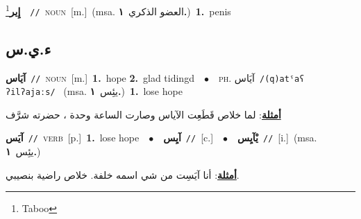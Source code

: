 \documentclass[10pt,a4paper,twoside]{article} %
\begin{document}
\begin{multicols}{2}
{\setlength\topsep{0pt}\textbf{\foreignlanguage{arabic}{إِير}}\footnote{Taboo}\ \ {\color{gray}\texttt{//}\color{black}}\ \textsc{noun}\ [m.]\ \color{gray}(msa. \foreignlanguage{arabic}{العضو الذكري}~\foreignlanguage{arabic}{\textbf{١.}})\color{black}\ \textbf{1.}~penis\ } \vspace{2mm}

\vspace{-3mm}
\subsection*{\color{blue}\foreignlanguage{arabic}{ء.ي.س}\color{blue}{}} 

{\setlength\topsep{0pt}\textbf{\foreignlanguage{arabic}{آيَاس}}\ {\color{gray}\texttt{//}\color{black}}\ \textsc{noun}\ [m.]\ \textbf{1.}~hope  \textbf{2.}~glad tidingd\ \ $\bullet$\ \ \textsc{ph.} \color{gray} \foreignlanguage{arabic}{آيَاس}\color{black}\ {\color{gray}\texttt{/{\sffamily (q)atˤaʕ ʔilʔajaːs}/}\color{black}}\ \color{gray} (msa. \foreignlanguage{arabic}{يئِس}~\foreignlanguage{arabic}{\textbf{١.}})\color{black}\ \textbf{1.}~lose hope\  \begin{flushright}\color{gray}\foreignlanguage{arabic}{\textbf{\underline{\foreignlanguage{arabic}{أمثلة}}}: لما خلاص قَطَعِت الآياس وصارت الساعة وحدة ، حضرته شرَّف}\end{flushright}\color{black}} \vspace{2mm}

{\setlength\topsep{0pt}\textbf{\foreignlanguage{arabic}{آيَس}}\ {\color{gray}\texttt{//}\color{black}}\ \textsc{verb}\ [p.]\ \textbf{1.}~lose hope\ \ $\bullet$\ \ \setlength\topsep{0pt}\textbf{\foreignlanguage{arabic}{آيِس}}\ {\color{gray}\texttt{//}\color{black}}\ [c.]\ \ $\bullet$\ \ \setlength\topsep{0pt}\textbf{\foreignlanguage{arabic}{يْآيِس}}\ {\color{gray}\texttt{//}\color{black}}\ [i.]\ \color{gray}(msa. \foreignlanguage{arabic}{يئِس}~\foreignlanguage{arabic}{\textbf{١.}})\color{black}\  \begin{flushright}\color{gray}\foreignlanguage{arabic}{\textbf{\underline{\foreignlanguage{arabic}{أمثلة}}}: أنا آيَسِت من شي اسمه خلفة. خلاص راضية بنصيبي.}\end{flushright}\color{black}} \vspace{2mm}


\end{multicols}
\end{document}
